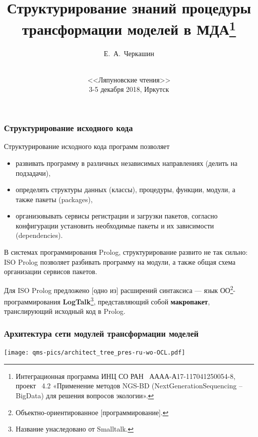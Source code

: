 \documentclass[10pt]{beamer}
\begin{document}
\title[Структурирование знаний в MDA]{Структурирование знаний процедуры трансформации моделей в МДА\thanks{Интеграционная программа ИНЦ СО РАН \textnumero~АААА-А17-117041250054-8, проект \textnumero~4.2 «Применение методов NGS-BD (NextGenerationSequencing – BigData) для решения вопросов экологии».}}
\author{Е.~А.~Черкашин}
\date[2018]{{}\\[1.5cm]
<<Ляпуновские чтения>>\\
3-5 декабря 2018, Иркутск
}
\maketitle

\begin{frame}
  \frametitle{Структурирование исходного кода}
  \begin{block}{Структурирование исходного кода программ позволяет}
  \begin{itemize}
  \item развивать программу в различных независимых направлениях (делить на подзадачи),
  \item определять структуры данных (классы), процедуры, функции, модули, а также пакеты (packages),
  \item организовывать сервисы регистрации и загрузки пакетов, согласно конфигурации установить необходимые пакеты и их зависимости (dependencies).
  \end{itemize}
\end{block}
  В системах программирования Prolog, структурирование развито не так сильно: ISO Prolog позволяет  разбивать программу на модули, а также общая схема организации сервисов пакетов.

Для ISO Prolog предложено [одно из] расширений синтаксиса --- язык ОО\footnote{Объектно-ориентированное [программирование].}-программирования \textbf{LogTalk}\footnote{Название унаследовано от Smalltalk.}, представляющий собой \textbf{макропакет}, транслирующий исходный код в Prolog.
\end{frame}

\begin{frame}
  \frametitle{Архитектура сети модулей трансформации моделей}
  \centering
  \texttt{[image: qms-pics/architect\_tree\_pres-ru-wo-OCL.pdf]}
\end{frame}
\end{document}
